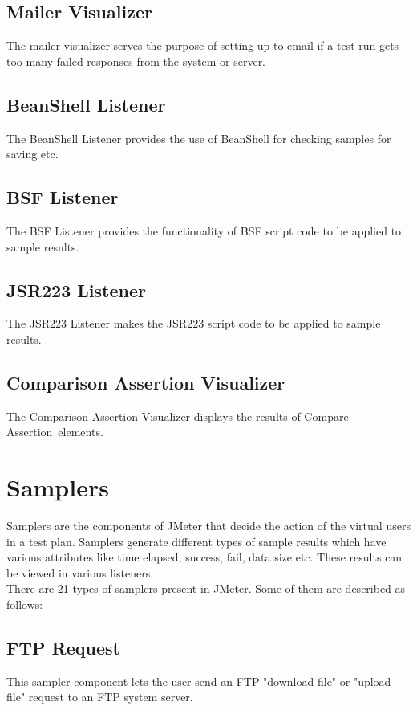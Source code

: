 \documentclass[12pt]{book}
\begin{document}
 \subsection{Mailer Visualizer}
 The mailer visualizer serves the purpose of setting up to email if a test run gets too many failed responses from the system or server.
 
 \subsection{BeanShell Listener}
 The BeanShell Listener provides the use of BeanShell for checking samples for saving etc.
 
 \subsection{BSF Listener}
 The BSF Listener provides the functionality of BSF script code to be applied to sample results.
 
 \subsection{JSR223 Listener}
 The JSR223 Listener makes the JSR223 script code to be applied to sample results.
 
 \subsection{Comparison Assertion Visualizer}
 The Comparison Assertion Visualizer displays the results of Compare Assertion elements.
 
\section{Samplers}
  Samplers are the components of JMeter that decide the action of the virtual users in a test plan. Samplers generate different types of sample 
  results which have various attributes like time elapsed,  success,  fail,  data size etc. These results can be viewed in various listeners.\\
  
  There are 21 types of samplers present in JMeter. Some of them are described as follows:\cite{Manual}
  

  \subsection{FTP Request}
  This sampler component lets the user send an FTP "download file" or "upload file" request to an FTP system server.
  
\end{document}
